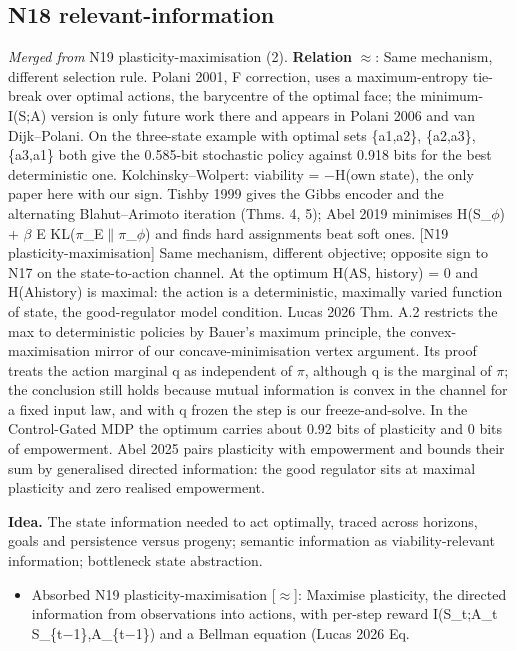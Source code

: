 \documentclass[10pt]{article}
\begin{document}
\subsection{N18 relevant-information}\label{node:S3-N18-relevant-information}
\textit{Merged from} N19 plasticity-maximisation (2). \textbf{Relation} $\approx$: Same mechanism, different selection rule. Polani 2001, F correction, uses a maximum-entropy tie-break over optimal actions, the barycentre of the optimal face; the minimum-I(S;A) version is only future work there and appears in Polani 2006 and van Dijk--Polani. On the three-state example with optimal sets \{a1,a2\}, \{a2,a3\}, \{a3,a1\} both give the 0.585-bit stochastic policy against 0.918 bits for the best deterministic one. Kolchinsky--Wolpert: viability = \ensuremath{-}H(own state), the only paper here with our sign. Tishby 1999 gives the Gibbs encoder and the alternating Blahut--Arimoto iteration (Thms. 4, 5); Abel 2019 minimises H(S\_\ensuremath{\phi}) + \ensuremath{\beta} E KL(\ensuremath{\pi}\_E\ensuremath{\|}\ensuremath{\pi}\_\ensuremath{\phi}) and finds hard assignments beat soft ones. [N19 plasticity-maximisation] Same mechanism, different objective; opposite sign to N17 on the state-to-action channel. At the optimum H(A\textbar{}S, history) = 0 and H(A\textbar{}history) is maximal: the action is a deterministic, maximally varied function of state, the good-regulator model condition. Lucas 2026 Thm. A.2 restricts the max to deterministic policies by Bauer's maximum principle, the convex-maximisation mirror of our concave-minimisation vertex argument. Its proof treats the action marginal q as independent of \ensuremath{\pi}, although q is the marginal of \ensuremath{\pi}; the conclusion still holds because mutual information is convex in the channel for a fixed input law, and with q frozen the step is our freeze-and-solve. In the Control-Gated MDP the optimum carries about 0.92 bits of plasticity and 0 bits of empowerment. Abel 2025 pairs plasticity with empowerment and bounds their sum by generalised directed information: the good regulator sits at maximal plasticity and zero realised empowerment.

\textbf{Idea.} The state information needed to act optimally, traced across horizons, goals and persistence versus progeny; semantic information as viability-relevant information; bottleneck state abstraction.
\begin{itemize}[nosep,leftmargin=1.2em]
\item Absorbed N19 plasticity-maximisation [\ensuremath{\approx}]: Maximise plasticity, the directed information from observations into actions, with per-step reward I(S\_t;A\_t \textbar{} S\_\{t\ensuremath{-}1\},A\_\{t\ensuremath{-}1\}) and a Bellman equation (Lucas 2026 Eq.
\end{itemize}
\end{document}
